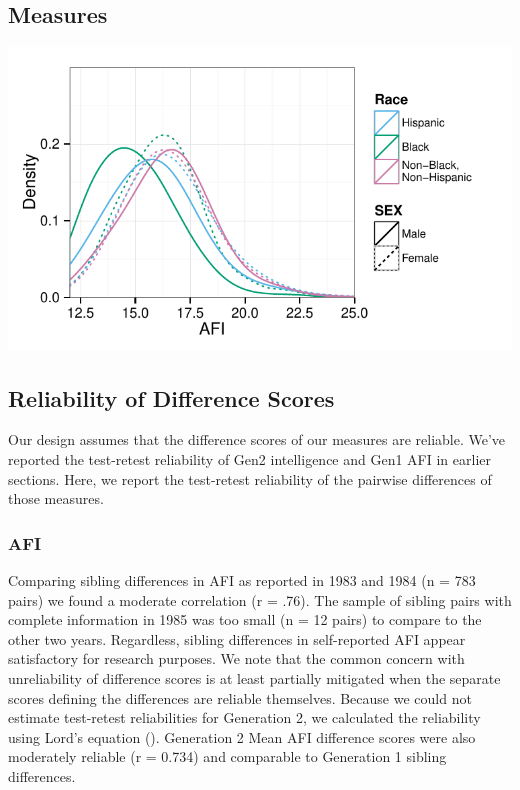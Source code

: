 \documentclass[a4paper,man,apacite,natbib,12pt,longtable]{apa6}\usepackage[]{graphicx}\usepackage[]{color}
\newenvironment{knitrout}{}{} %
\begin{document}
\subsection{Measures}

\noindent\begin{minipage}{\linewidth}
\label{plot_afi_by_race_sex}
\begin{center}
\begin{knitrout}
\color{fgcolor}
\includegraphics[width=.8\paperwidth]{figure/plot_afi_by_race_sex-1} 

\end{knitrout}
\end{center}
\end{minipage}
%

%
\subsection{Reliability of Difference Scores}

Our design assumes that the difference scores of our measures are reliable. We've reported the test-retest reliability of Gen2 intelligence and Gen1 AFI in earlier sections. Here, we report the test-retest reliability of the pairwise differences of those measures. 
\subsubsection{AFI} Comparing sibling differences in AFI as reported in 1983 and 1984 (n = 783 pairs) we found a moderate correlation (r = .76). The sample of sibling pairs with complete information in 1985 was too small (n = 12 pairs) to compare to the other two years. Regardless, sibling differences in self-reported AFI appear satisfactory for research purposes. We note that the common concern with unreliability of difference scores is at least partially mitigated when the separate scores defining the differences are reliable themselves. Because we could not estimate test-retest reliabilities for Generation 2, we calculated the reliability using Lord's equation (\citeyear{Lord1963}). Generation 2 Mean AFI difference scores were also moderately reliable (r = 0.734) and comparable to Generation 1 sibling differences.
\end{document}
